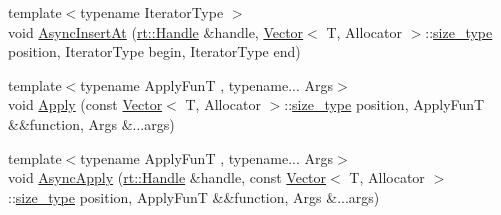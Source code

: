 \begin{DoxyCompactItemize}
{\footnotesize template$<$typename Iterator\-Type $>$ }\\void \hyperlink{classshad_1_1Vector_a0feab819cbb5f85388a42e9548983479}{Async\-Insert\-At} (\hyperlink{classshad_1_1rt_1_1Handle}{rt\-::\-Handle} \&handle, \hyperlink{classshad_1_1Vector}{Vector}$<$ T, Allocator $>$\-::\hyperlink{classshad_1_1Vector_a1c97f4eb87d738cb4de97e5b3587c397}{size\-\_\-type} position, Iterator\-Type begin, Iterator\-Type end)
\item 
{\footnotesize template$<$typename Apply\-Fun\-T , typename... Args$>$ }\\void \hyperlink{classshad_1_1Vector_a5f503abd217734deaa5baafb8142ab45}{Apply} (const \hyperlink{classshad_1_1Vector}{Vector}$<$ T, Allocator $>$\-::\hyperlink{classshad_1_1Vector_a1c97f4eb87d738cb4de97e5b3587c397}{size\-\_\-type} position, Apply\-Fun\-T \&\&function, Args \&...args)
\item 
{\footnotesize template$<$typename Apply\-Fun\-T , typename... Args$>$ }\\void \hyperlink{classshad_1_1Vector_a81e9f5dd9a9f35d59df36c8e7bb334c2}{Async\-Apply} (\hyperlink{classshad_1_1rt_1_1Handle}{rt\-::\-Handle} \&handle, const \hyperlink{classshad_1_1Vector}{Vector}$<$ T, Allocator $>$\-::\hyperlink{classshad_1_1Vector_a1c97f4eb87d738cb4de97e5b3587c397}{size\-\_\-type} position, Apply\-Fun\-T \&\&function, Args \&...args)
\end{DoxyCompactItemize}
